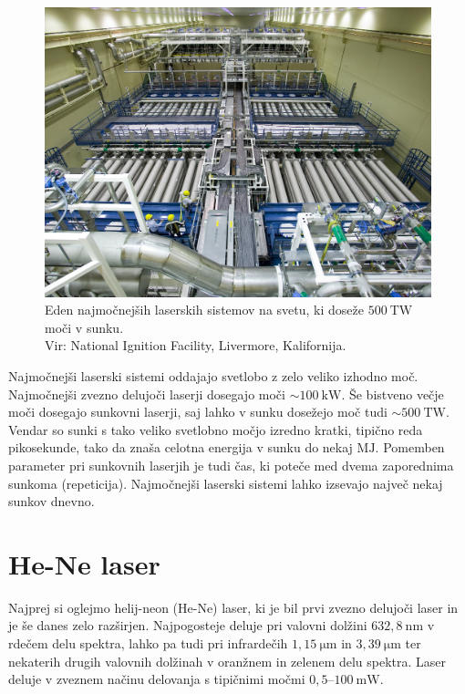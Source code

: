 \begin{figure}[h!]
\centering
\includegraphics[width=100truemm]{slike/07_NIF_Laser_Bay.jpg}
\caption{Eden najmočnejših laserskih sistemov na svetu, ki doseže 
$500~\si{\tera\watt}$ moči v sunku. \\Vir: National Ignition Facility, Livermore, Kalifornija.}
\label{fig:NIF}
\end{figure}

Najmočnejši laserski sistemi oddajajo svetlobo z zelo veliko izhodno moč. 
Najmočnejši zvezno delujoči laserji dosegajo moči 
$\sim 100~\si{\kilo\watt}$. Še bistveno večje moči dosegajo sunkovni laserji, 
saj lahko v sunku dosežejo moč tudi $\sim 500~\si{\tera\watt}$. 
Vendar so sunki s tako veliko svetlobno močjo izredno kratki, tipično reda pikosekunde, tako da
znaša celotna energija v sunku do nekaj $\si{\mega\joule}$. Pomemben
parameter pri sunkovnih laserjih je tudi čas, ki poteče med dvema zaporednima
sunkoma (repeticija). Najmočnejši laserski sistemi lahko izsevajo največ nekaj sunkov dnevno. 

\section{He-Ne laser}
Najprej si oglejmo helij-neon (He-Ne) laser, ki je bil prvi zvezno 
delujoči laser in je še danes zelo razširjen. Najpogosteje deluje 
pri valovni dolžini $632,8~\si{\nano\metre}$ v rdečem delu spektra, lahko 
pa tudi pri infrardečih $1,15~\si{\micro\metre}$ in 
$3,39~\si{\micro\metre}$ ter nekaterih drugih
valovnih dolžinah v oranžnem in zelenem delu spektra. Laser deluje v zveznem 
načinu delovanja s tipičnimi močmi $0,5$--$100~\si{\milli\watt}$.

